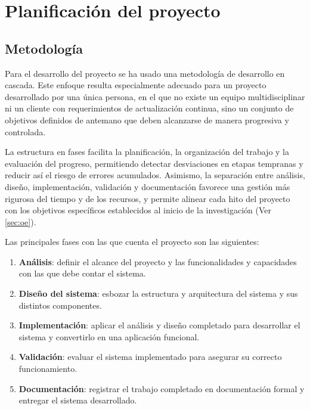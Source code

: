 \chapter{Planificación del proyecto}
\label{ch:pm}

\section{Metodología}

Para el desarrollo del proyecto se ha usado una metodología de desarrollo en cascada. Este enfoque resulta especialmente adecuado para un proyecto desarrollado por una única persona, en el que no existe un equipo multidisciplinar ni un cliente con requerimientos de actualización continua, sino un conjunto de objetivos definidos de antemano que deben alcanzarse de manera progresiva y controlada.

La estructura en fases facilita la planificación, la organización del trabajo y la evaluación del progreso, permitiendo detectar desviaciones en etapas tempranas y reducir así el riesgo de errores acumulados. Asimismo, la separación entre análisis, diseño, implementación, validación y documentación favorece una gestión más rigurosa del tiempo y de los recursos, y permite alinear cada hito del proyecto con los objetivos específicos establecidos al inicio de la investigación (Ver \ref{sec:oe}).

Las principales fases con las que cuenta el proyecto son las siguientes:

\begin{enumerate}
    \item \textbf{Análisis}: definir el alcance del proyecto y las funcionalidades y capacidades con las que debe contar el sistema.
    \item \textbf{Diseño del sistema}: esbozar la estructura y arquitectura del sistema y sus distintos componentes.
    \item \textbf{Implementación}: aplicar el análisis y diseño completado para desarrollar el sistema y convertirlo en una aplicación funcional.
    \item \textbf{Validación}: evaluar el sistema implementado para asegurar su correcto funcionamiento.
    \item \textbf{Documentación}: registrar el trabajo completado en documentación formal y entregar el sistema desarrollado.
\end{enumerate}

